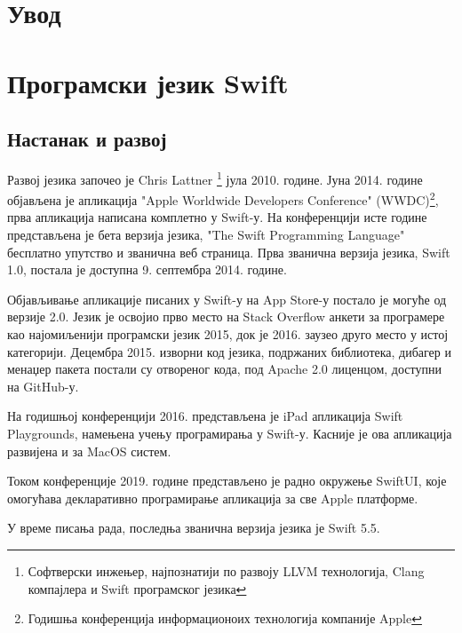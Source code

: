 \documentclass[12pt,oneside]{memoir}
\begin{document}
\frontmatter
\naslovna
\komisija
\apstrakt
\tableofcontents*


\mainmatter

\chapter{Увод}

\chapter{Програмски језик Swift}

\section{Настанак и развој}

\indent Развој језика започео је Chris Lattner \footnote{Софтверски инжењер, најпознатији по развоју LLVM технологија, Clang компајлера и Swift програмског језика} јула 2010. године. Јуна 2014. године објављена је апликација "Apple Worldwide Developers Conference" (WWDC)\footnote{Годишња конференција информационоих технологија компаније Apple}\cite{WWDC}, прва апликација написана комплетно у Swift-у. На конференцији исте године представљена је бета верзија језика, "The Swift Programming Language"\cite{SwiftProgrammingLanguage} бесплатно упутство и званична веб страница\cite{SwiftOfficialSite}. Прва званична верзија језика, Swift 1.0, постала је доступна 9. септембра 2014. године.

\indent Објављивање апликације писаних у Swift-у на App Storе-у постало је могуће од верзије 2.0. Језик је освојио прво место на Stack Overflow\cite{StackOverflow} анкети за програмере као најомиљенији програмски језик 2015, док је 2016. заузео друго место у истој категорији. Децембра 2015. изворни код језика, подржаних библиотека, дибагер и менаџер пакета постали су отвореног кода, под Apache 2.0 лиценцом, доступни на GitHub-у\cite{GitHub_Swift}.

\indent На годишњој конференцији 2016. представљена је iPad апликација Swift Playgrounds\cite{Swift_Playground}, намењена учењу програмирања у Swift-у. Касније је ова апликација развијена и за MacOS систем.

\indent Током конференције 2019. године представљено је радно окружење SwiftUI\cite{Swift_SwiftUI}, које омогућава декларативно програмирање апликација за све Apple платформе.

\indent У време писања рада, последња званична верзија језика је Swift 5.5.
\end{document}
